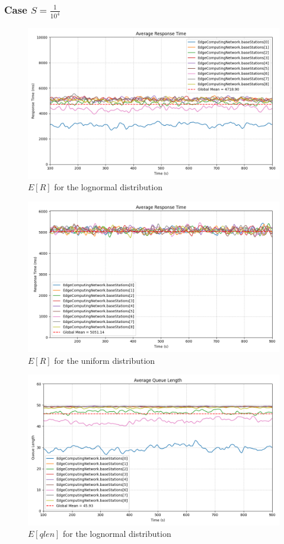\documentclass{report}
\begin{document}
\subsubsection*{Case $S=\frac{1}{10^4}$}

\begin{figure}[H]
    \centering
    \includegraphics[width=\textwidth]{img/plots/log_1e4_A/resptime.png}
    \caption{$E[R]$ for the lognormal distribution}
\end{figure}

\begin{figure}[H]
    \centering
    \includegraphics[width=\textwidth]{img/plots/uni_1e4_A/resptime.png}
    \caption{$E[R]$ for the uniform distribution}
\end{figure}

\begin{figure}[H]
    \centering
    \includegraphics[width=\textwidth]{img/plots/log_1e4_A/qlen.png}
    \caption{$E[qlen]$ for the lognormal distribution}
\end{figure}
\end{document}
